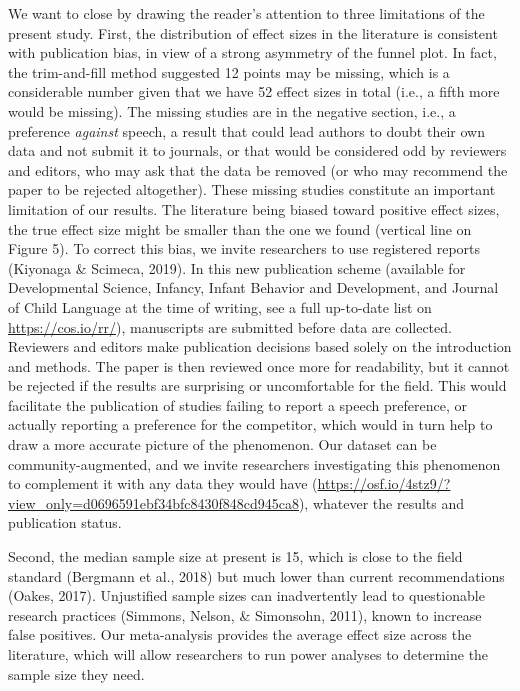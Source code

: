 \documentclass[man]{apa6}
\begin{document}
We want to close by drawing the reader's attention to three limitations
of the present study. First, the distribution of effect sizes in the
literature is consistent with publication bias, in view of a strong
asymmetry of the funnel plot. In fact, the trim-and-fill method
suggested 12 points may be missing, which is a considerable number given
that we have 52 effect sizes in total (i.e., a fifth more would be
missing). The missing studies are in the negative section, i.e., a
preference \emph{against} speech, a result that could lead authors to
doubt their own data and not submit it to journals, or that would be
considered odd by reviewers and editors, who may ask that the data be
removed (or who may recommend the paper to be rejected altogether).
These missing studies constitute an important limitation of our results.
The literature being biased toward positive effect sizes, the true
effect size might be smaller than the one we found (vertical line on
Figure 5). To correct this bias, we invite researchers to use registered
reports (Kiyonaga \& Scimeca, 2019). In this new publication scheme
(available for Developmental Science, Infancy, Infant Behavior and
Development, and Journal of Child Language at the time of writing, see a
full up-to-date list on \url{https://cos.io/rr/}), manuscripts are
submitted before data are collected. Reviewers and editors make
publication decisions based solely on the introduction and methods. The
paper is then reviewed once more for readability, but it cannot be
rejected if the results are surprising or uncomfortable for the field.
This would facilitate the publication of studies failing to report a
speech preference, or actually reporting a preference for the
competitor, which would in turn help to draw a more accurate picture of
the phenomenon. Our dataset can be community-augmented, and we invite
researchers investigating this phenomenon to complement it with any data
they would have
(\url{https://osf.io/4stz9/?view_only=d0696591ebf34bfc8430f848cd945ca8}),
whatever the results and publication status.

Second, the median sample size at present is 15, which is close to the
field standard (Bergmann et al., 2018) but much lower than current
recommendations (Oakes, 2017). Unjustified sample sizes can
inadvertently lead to questionable research practices (Simmons, Nelson,
\& Simonsohn, 2011), known to increase false positives. Our
meta-analysis provides the average effect size across the literature,
which will allow researchers to run power analyses to determine the
sample size they need.
\end{document}
